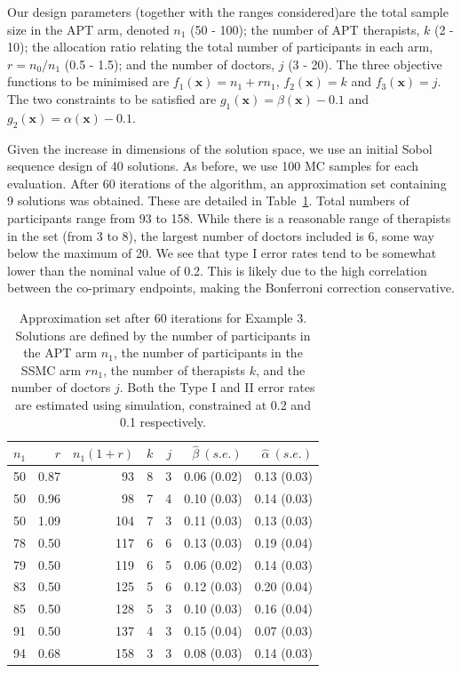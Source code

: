 \documentclass{article} %
\begin{document}
Our design parameters (together with the ranges considered)are the total sample size in the APT arm, denoted $n_1$ (50 - 100); the number of APT therapists, $k$ (2 - 10); the allocation ratio relating the total number of participants in each arm, $r = n_0/n_1$ (0.5 - 1.5); and the number of doctors, $j$ (3 - 20). The three objective functions to be minimised are $f_{1}(\mathbf{x}) = n_1 + rn_1$, $f_{2}(\mathbf{x}) = k$ and $f_{3}(\mathbf{x}) = j$. The two constraints to be satisfied are $g_{1}(\mathbf{x}) = \beta(\mathbf{x}) - 0.1$ and $g_{2}(\mathbf{x}) = \alpha(\mathbf{x}) - 0.1$.

Given the increase in dimensions of the solution space, we use an initial Sobol sequence design of 40 solutions. As before, we use 100 MC samples for each evaluation. After 60 iterations of the algorithm, an approximation set containing 9 solutions was obtained. These are detailed in Table~\ref{tab:ex3_single_run}. Total numbers of participants range from 93 to 158. While there is a reasonable range of therapists in the set (from 3 to 8), the largest number of doctors included is 6, some way below the maximum of 20. We see that type I error rates tend to be somewhat lower than the nominal value of 0.2. This is likely due to the high correlation between the co-primary endpoints, making the Bonferroni correction conservative. 

\begin{table}
\caption{Approximation set after 60 iterations for Example 3. Solutions are defined by the number of participants in the APT arm $n_1$, the number of participants in the SSMC arm $r n_1$, the number of therapists $k$, and the number of doctors $j$. Both the Type I and II error rates are estimated using simulation, constrained at 0.2 and 0.1 respectively.}
\centering
\begin{tabular}{rrrrrrr}
\toprule
$n_1$ & $r$ & $n_1(1+r)$ & $k$ & $j$ & $\hat{\beta}~(s.e.)$ & $\hat{\alpha}~(s.e.)$ \\ 
\midrule
50  &        0.87  &        93  & 8 &  3 & 0.06 (0.02) & 0.13  (0.03) \\
50  &       0.96   &       98   &7  & 4 & 0.10   (0.03) & 0.14  (0.03) \\
50  &       1.09   &      104   &7  & 3 & 0.11   (0.03) & 0.13  (0.03) \\
78  &        0.50  &       117  & 6 &  6 & 0.13  (0.03) & 0.19   (0.04) \\
79  &        0.50  &       119  & 6 &  5 & 0.06  (0.02) & 0.14   (0.03) \\
83  &        0.50  &       125 & 5 &  6 & 0.12  (0.03)& 0.20   (0.04) \\
85  &        0.50  &       128  & 5 &  3 & 0.10  (0.03) & 0.16   (0.04) \\
91  &        0.50  &       137  & 4 &  3 & 0.15  (0.04) & 0.07  (0.03) \\
94  &        0.68  &       158  & 3 &  3 & 0.08  (0.03) & 0.14   (0.03) \\
\bottomrule
\end{tabular}
\label{tab:ex3_single_run}
\end{table}
\end{document}
